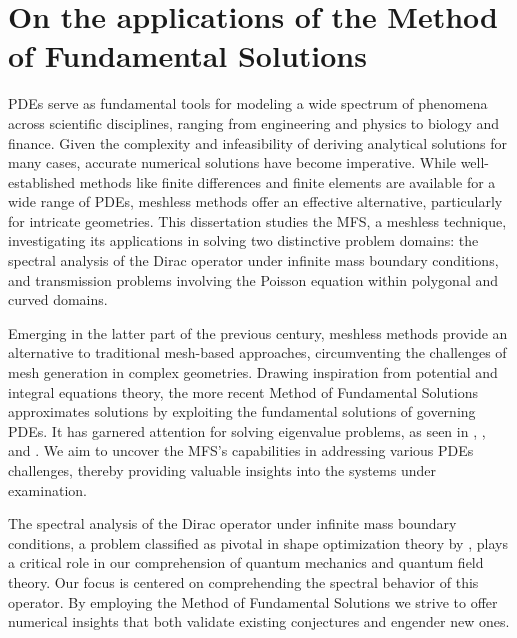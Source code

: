 \label{chap:intro}

\section{On the applications of the Method of Fundamental Solutions}

\acp{PDE} serve as fundamental tools for modeling a wide spectrum of phenomena across scientific disciplines, ranging from engineering and physics to biology and finance. Given the complexity and infeasibility of deriving analytical solutions for many cases, accurate numerical solutions have become imperative. While well-established methods like finite differences and finite elements are available for a wide range of \acp{PDE}, meshless methods offer an effective alternative, particularly for intricate geometries. This dissertation studies the \ac{MFS}, a meshless technique, investigating its applications in solving two distinctive problem domains: the spectral analysis of the Dirac operator under infinite mass boundary conditions, and transmission problems involving the Poisson equation within polygonal and curved domains.

Emerging in the latter part of the previous century, meshless methods provide an alternative to traditional mesh-based approaches, circumventing the challenges of mesh generation in complex geometries. Drawing inspiration from potential and integral equations theory, the more recent Method of Fundamental Solutions approximates solutions by exploiting the fundamental solutions of governing \acp{PDE}. It has garnered attention for solving eigenvalue problems, as seen in \cite{alves2013method}, \cite{reutskiy2006method}, and \cite{antunes2011inverse}. We aim to uncover the \ac{MFS}'s capabilities in addressing various \acp{PDE} challenges, thereby providing valuable insights into the systems under examination.

The spectral analysis of the Dirac operator under infinite mass boundary conditions, a problem classified as pivotal in shape optimization theory by \cite{krejcirik_larson_lotoreichik_2019}, plays a critical role in our comprehension of quantum mechanics and quantum field theory. Our focus is centered on comprehending the spectral behavior of this operator. By employing the Method of Fundamental Solutions we strive to offer numerical insights that both validate existing conjectures and engender new ones.

